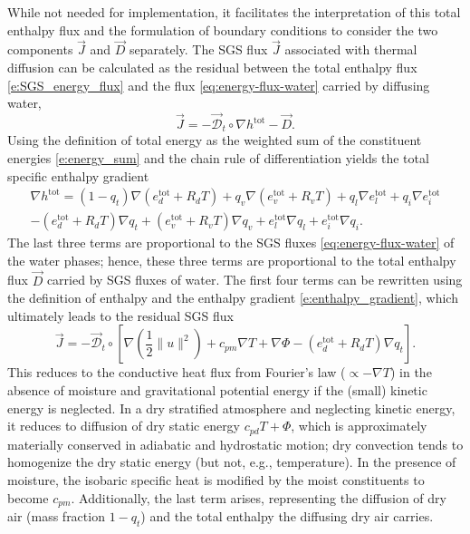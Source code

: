 \documentclass{report}
\begin{document}
While not needed for implementation, it facilitates the interpretation of this total enthalpy flux and the formulation of boundary conditions to consider the two components $\vec{J}$ and $\vec{D}$ separately. The SGS flux $\vec{J}$ associated with thermal diffusion can be calculated as the residual between the total enthalpy flux \eqref{e:SGS_energy_flux} and the flux \eqref{eq:energy-flux-water} carried by diffusing water, 
\[
    \vec{J} = - \vec{\mathcal{D}}_t \circ \nabla h^{\mathrm{tot}} - \vec{D}.
\]
Using the definition of total energy as the weighted sum of the constituent energies \eqref{e:energy_sum} and the chain rule of differentiation yields the total specific enthalpy gradient
\begin{multline*}
\nabla h^{\mathrm{tot}}
= (1-q_t)\nabla (e_d^{\mathrm{tot}} + R_d T) + q_v \nabla (e_v^{\mathrm{tot}} + R_v T) + q_l \nabla e_l^{\mathrm{tot}} + q_i \nabla e_i^{\mathrm{tot}} \\
- (e_d^{\mathrm{tot}} + R_d T) \nabla q_t + (e_v^{\mathrm{tot}} + R_v T) \nabla q_v + e_l^{\mathrm{tot}}\nabla q_l + e_i^{\mathrm{tot}} \nabla q_i.
\end{multline*}
The last three terms are proportional to the SGS fluxes \eqref{eq:energy-flux-water} of the water phases; hence, these three terms are proportional to the total enthalpy flux $\vec{D}$ carried by SGS fluxes of water. The first four terms can be rewritten using the definition of enthalpy and the enthalpy gradient \eqref{e:enthalpy_gradient}, which ultimately leads to the residual SGS flux
\begin{equation}\label{e:sgs_heat_flux}
\vec{J} = - \vec{\mathcal{D}}_t \circ \left[ \nabla \left( \frac{1}{2} \| u \|^2 \right) + c_{pm} \nabla T + \nabla \Phi - (e_d^{\mathrm{tot}} + R_d T) \nabla q_t \right].
\end{equation}
This reduces to the conductive heat flux from Fourier's law ($\propto -\nabla T$) in the absence of moisture and gravitational potential energy if the (small) kinetic energy is neglected. In a dry stratified atmosphere and neglecting kinetic energy, it reduces to diffusion of dry static energy $c_{pd} T + \Phi$, which is approximately materially conserved in adiabatic and hydrostatic motion; dry convection tends to homogenize the dry static energy (but not, e.g., temperature). In the presence of moisture, the isobaric specific heat is modified by the moist constituents to become $c_{pm}$. Additionally, the last term arises, representing the diffusion of dry air (mass fraction $1-q_t$) and the total enthalpy the diffusing dry air carries.
\end{document}
